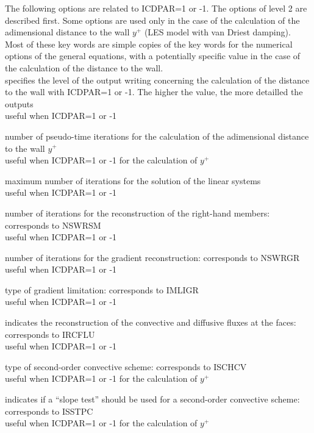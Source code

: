 The following options are related to ICDPAR=1 or -1. The options of
level 2 are described first. Some options are used only in the case of
the calculation of the adimensional distance to the wall $y^+$ (LES model with
van Driest damping). Most of these key words are simple copies of the
key words for the numerical options of the general equations, with a potentially
specific value in the case of the calculation of the distance to the wall.\\

{specifies the level of the output writing concerning the calculation of the
distance to the wall with ICDPAR=1 or -1. The higher the value, the more
detailled the outputs\\
useful when ICDPAR=1 or -1}

{number of pseudo-time iterations for the calculation of the adimensional
distance to the wall $y^+$\\
useful when ICDPAR=1 or -1 for the calculation of $y^+$}

{maximum number of iterations for the solution of the linear systems\\
useful when ICDPAR=1 or -1}

{number of iterations for the reconstruction of the right-hand members:
corresponds to NSWRSM\\
useful when ICDPAR=1 or -1}

{number of iterations for the gradient reconstruction: corresponds to NSWRGR\\
useful when ICDPAR=1 or -1}

{type of gradient limitation: corresponds to IMLIGR\\
useful when ICDPAR=1 or -1}

{indicates the reconstruction of the convective and diffusive fluxes at
the faces: corresponds to IRCFLU\\
useful when ICDPAR=1 or -1}

{type of second-order convective scheme: corresponds to ISCHCV\\
useful when ICDPAR=1 or -1 for the calculation of $y^+$}

{indicates if a ``slope test'' should be used for a second-order convective
scheme: corresponds to ISSTPC\\
useful when ICDPAR=1 or -1 for the calculation of $y^+$}


